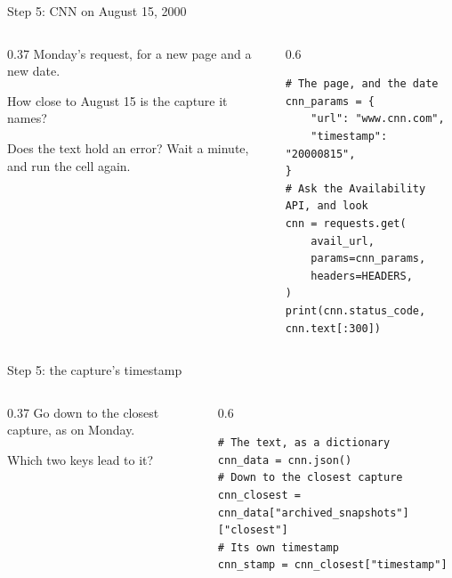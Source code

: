 \documentclass[9pt,aspectratio=169]{beamer}
\begin{document}
\begin{frame}[fragile]{Step 5: CNN on August 15, 2000}
    \begin{columns}[T]
        \begin{column}{0.37\textwidth}
            Monday's request, for a new page and a new date.

            \medskip
            How close to August 15 is the capture it names?

            \medskip
            Does the text hold an error? Wait a minute, and run the cell again.
        \end{column}
        \begin{column}{0.6\textwidth}
\begin{lstlisting}
# The page, and the date
cnn_params = {
    "url": "www.cnn.com",
    "timestamp": "20000815",
}
# Ask the Availability API, and look
cnn = requests.get(
    avail_url,
    params=cnn_params,
    headers=HEADERS,
)
print(cnn.status_code, cnn.text[:300])
\end{lstlisting}
        \end{column}
    \end{columns}
\end{frame}

\begin{frame}[fragile]{Step 5: the capture's timestamp}
    \begin{columns}[T]
        \begin{column}{0.37\textwidth}
            Go down to the closest capture, as on Monday.

            \medskip
            Which two keys lead to it?
        \end{column}
        \begin{column}{0.6\textwidth}
\begin{lstlisting}
# The text, as a dictionary
cnn_data = cnn.json()
# Down to the closest capture
cnn_closest = cnn_data["archived_snapshots"]["closest"]
# Its own timestamp
cnn_stamp = cnn_closest["timestamp"]
\end{lstlisting}
        \end{column}
    \end{columns}
\end{frame}
\end{document}
